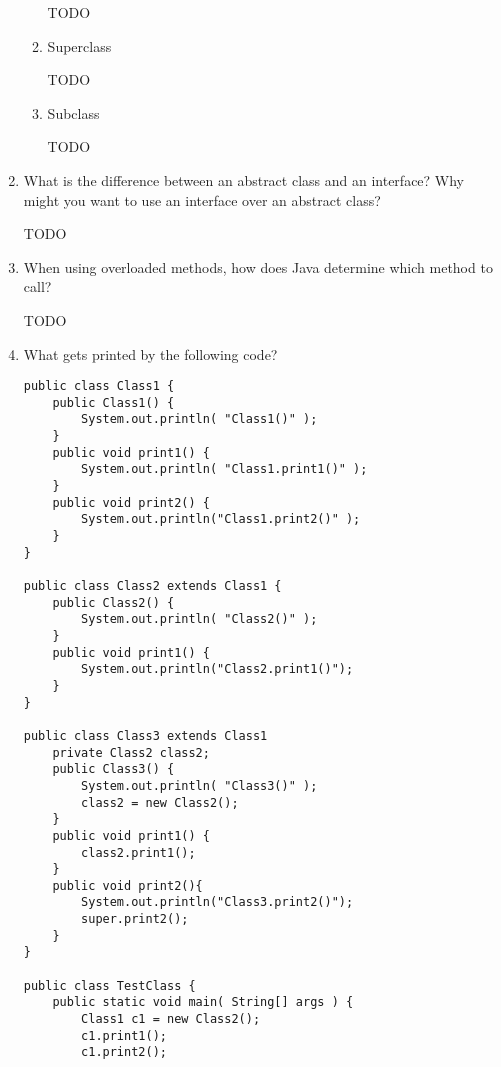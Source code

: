 \documentclass[11pt]{article}
\newenvironment{answer}{\large\lstset{basicstyle=\large}\color{white}}{}
\newenvironment{answer}{\large\lstset{basicstyle=\large}\color{red}}{}
\begin{document}
\begin{enumerate}
\begin{enumerate}
        \begin{answer}
        \huge TODO
        \end{answer}

    \item Superclass

        \begin{answer}
        \huge TODO
        \end{answer}

    \item Subclass

        \begin{answer}
        \huge TODO
        \end{answer}
    \end{enumerate}

\item What is the difference between an abstract class and an interface? Why
      might you want to use an interface over an abstract class?

      \begin{answer}
      \huge TODO
      \end{answer}

\item When using overloaded methods, how does Java determine which method to
      call?

    \begin{answer}
    \huge TODO
    \end{answer}

\pagebreak
\item What gets printed by the following code?
\begin{lstlisting}
public class Class1 {
	public Class1() {
		System.out.println( "Class1()" );
	}
	public void print1() {
		System.out.println( "Class1.print1()" );
	}
	public void print2() {
		System.out.println("Class1.print2()" );
	}
}

public class Class2 extends Class1 {
	public Class2() {
		System.out.println( "Class2()" );
	}
	public void print1() {
		System.out.println("Class2.print1()");
	}
}

public class Class3 extends Class1
	private Class2 class2;
	public Class3() {
		System.out.println( "Class3()" );
		class2 = new Class2();
	}
	public void print1() {
		class2.print1();
	}
	public void print2(){
		System.out.println("Class3.print2()");
		super.print2();
	}
}

public class TestClass {
	public static void main( String[] args ) {
		Class1 c1 = new Class2();
		c1.print1();
		c1.print2();


\end{lstlisting}
\end{enumerate}
\end{document}
